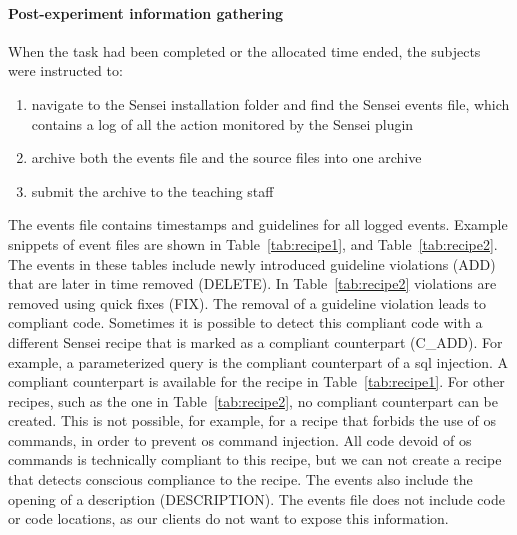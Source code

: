 \paragraph{Post-experiment information gathering}
\label{sec:after}
When the task had been completed or the allocated time ended, the subjects were instructed to:

\begin{enumerate}[noitemsep]
    \item navigate to the Sensei installation folder and find the Sensei events file, which contains a log of all the action monitored by the Sensei plugin
    \item archive both the events file and the source files into one archive
    \item submit the archive to the teaching staff
\end{enumerate}

The events file contains timestamps and guidelines for all logged events.
Example snippets of event files are shown in Table~\ref{tab:recipe1}, and Table~\ref{tab:recipe2}.
The events in these tables include newly introduced guideline violations (ADD) that are later in time removed (DELETE).
In Table~\ref{tab:recipe2} violations are removed using quick fixes (FIX).
The removal of a guideline violation leads to compliant code.
Sometimes it is possible to detect this compliant code with a different Sensei recipe that is marked as a compliant counterpart (C\_ADD).
For example, a parameterized query is the compliant counterpart of a \gls{sql} injection.
A compliant counterpart is available for the recipe in Table~\ref{tab:recipe1}.
For other recipes, such as the one in Table~\ref{tab:recipe2}, no compliant counterpart can be created.
This is not possible, for example, for a recipe that forbids the use of \gls{os} commands, in order to prevent \gls{os} command injection.
All code devoid of \gls{os} commands is technically compliant to this recipe, but we can not create a recipe that detects conscious compliance to the recipe.
The events also include the opening of a description (DESCRIPTION).
The events file does not include code or code locations, as our clients do not want to expose this information.

